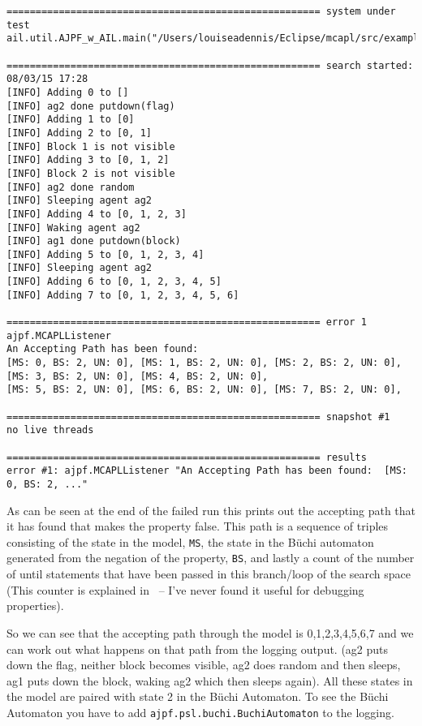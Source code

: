 \documentclass[a4]{article}
\begin{document}
\begin{footnotesize}
\begin{verbatim}
====================================================== system under test
ail.util.AJPF_w_AIL.main("/Users/louiseadennis/Eclipse/mcapl/src/examples/gwendolen/ajpf_tutorials/tutorial2/TwoPickUpAgents.ail","/Users/louiseadennis/Eclipse/mcapl/src/examples/gwendolen/ajpf_tutorials/tutorial2/PickUpAgent.psl","2")

====================================================== search started: 08/03/15 17:28
[INFO] Adding 0 to []
[INFO] ag2 done putdown(flag)
[INFO] Adding 1 to [0]
[INFO] Adding 2 to [0, 1]
[INFO] Block 1 is not visible
[INFO] Adding 3 to [0, 1, 2]
[INFO] Block 2 is not visible
[INFO] ag2 done random
[INFO] Sleeping agent ag2
[INFO] Adding 4 to [0, 1, 2, 3]
[INFO] Waking agent ag2
[INFO] ag1 done putdown(block)
[INFO] Adding 5 to [0, 1, 2, 3, 4]
[INFO] Sleeping agent ag2
[INFO] Adding 6 to [0, 1, 2, 3, 4, 5]
[INFO] Adding 7 to [0, 1, 2, 3, 4, 5, 6]

====================================================== error 1
ajpf.MCAPLListener
An Accepting Path has been found: 
[MS: 0, BS: 2, UN: 0], [MS: 1, BS: 2, UN: 0], [MS: 2, BS: 2, UN: 0], [MS: 3, BS: 2, UN: 0], [MS: 4, BS: 2, UN: 0],
[MS: 5, BS: 2, UN: 0], [MS: 6, BS: 2, UN: 0], [MS: 7, BS: 2, UN: 0], 

====================================================== snapshot #1
no live threads

====================================================== results
error #1: ajpf.MCAPLListener "An Accepting Path has been found:  [MS: 0, BS: 2, ..."
\end{verbatim}
\end{footnotesize}

As can be seen at the end of the failed run this prints out the accepting path that it has found that makes the property false.  This path is a sequence of triples consisting of the state in the model, \texttt{MS}, the state in the B\"{u}chi automaton generated from the negation of the property, \texttt{BS}, and lastly a count of the number of until statements that have been passed in this branch/loop of the search space (This counter is explained in~\cite{Gerth:1995:SOA:645837.670574} -- I've never found it useful for debugging properties).

So we can see that the accepting path through the model is 0,1,2,3,4,5,6,7 and we can work out what happens on that path from the logging output.  (ag2 puts down the flag, neither block becomes visible, ag2 does random and then sleeps, ag1 puts down the block, waking ag2 which then sleeps again).  All these states in the model are paired with state 2 in the B\"{u}chi Automaton.  To see the B\"{u}chi Automaton you have to add \texttt{ajpf.psl.buchi.BuchiAutomaton} to the logging.
\end{document}
